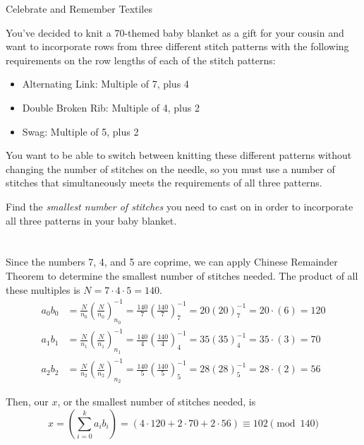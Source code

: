 \begin{homeworkProblem}{Celebrate and Remember Textiles}

    You've decided to knit a 70-themed baby blanket as a gift for your cousin and
    want to incorporate rows from three different stitch patterns with the
    following requirements on the row lengths of each of the stitch patterns:
    \begin{itemize}
    \item Alternating Link: Multiple of 7, plus 4
    \item Double Broken Rib: Multiple of 4, plus 2
    \item Swag: Multiple of 5, plus 2
    \end{itemize}
    
    You want to be able to switch between knitting these different
    patterns without changing the number of stitches on the needle, so you
    must use a number of stitches that simultaneously meets the requirements of all three
    patterns.

    Find the \emph{smallest number of stitches} you need to cast on in
    order to incorporate all three patterns in your baby blanket.    
    \\ \\
    \solution \\ 
    Since the numbers 7, 4, and 5 are coprime, we can apply Chinese Remainder 
    Theorem to determine the smallest number of stitches needed. The product 
    of all these multiples is $N = 7 \cdot 4 \cdot 5 = 140$.  
    \[
        \begin{split}
            a_0 b_0 &= \frac{N}{n_0} \left( \frac{N}{n_0} \right)^{-1}_{n_0} =
            \frac{140}{7} \left( \frac{140}{7} \right)^{-1}_{7} = 
            20 \left( 20 \right)^{-1}_{7} =
            20 \cdot (6) = 
            120 \\
            a_1 b_1 &= \frac{N}{n_1} \left( \frac{N}{n_1} \right)^{-1}_{n_1} =
            \frac{140}{4} \left( \frac{140}{4} \right)^{-1}_{4} = 
            35 \left( 35 \right)^{-1}_{4} = 
            35 \cdot (3) = 
            70 \\
            a_2 b_2 &= \frac{N}{n_2} \left( \frac{N}{n_2} \right)^{-1}_{n_2} =
            \frac{140}{5} \left( \frac{140}{5} \right)^{-1}_{5} =
            28 \left( 28 \right)^{-1}_{5} =
            28 \cdot (2) =
            56
        \end{split}
    \]

    Then, our $x$, or the smallest number of stitches needed, is 
    \[
        x = \left( \sum_{i=0}^{k} a_i b_i \right) =
        \left( 4 \cdot 120 + 2 \cdot 70 + 2 \cdot 56 \right) \equiv
        102 \pmod{140}
    \]

\end{homeworkProblem}